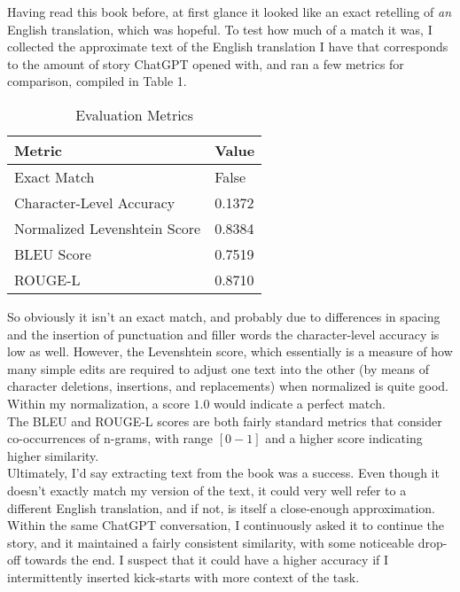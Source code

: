 \documentclass{article}
\begin{document}
Having read this book before, at first glance it looked like an exact retelling of \textit{an} English translation, which was hopeful. To test how much of a match it was, I collected the approximate text of the English translation I have that corresponds to the amount of story ChatGPT opened with, and ran a few metrics for comparison, compiled in Table 1. \\

	\begin{table}[h!]
		\centering
		\begin{tabular}{@{}ll@{}}
			\toprule
			\textbf{Metric}                   & \textbf{Value}            \\ \midrule
			Exact Match                       & False                     \\
			Character-Level Accuracy          & 0.1372                    \\
			Normalized Levenshtein Score      & 0.8384                    \\
			BLEU Score                        & 0.7519                    \\
			ROUGE-L                           & 0.8710                    \\ \bottomrule
		\end{tabular}
		\caption{Evaluation Metrics}
		\label{tab:metrics}
	\end{table}


So obviously it isn't an exact match, and probably due to differences in spacing and the insertion of punctuation and filler words the character-level accuracy is low as well. However, the Levenshtein score, which essentially is a measure of how many simple edits are required to adjust one text into the other (by means of character deletions, insertions, and replacements) when normalized is quite good. Within my normalization, a score $1.0$ would indicate a perfect match. \\

The BLEU and ROUGE-L scores are both fairly standard metrics that consider co-occurrences of n-grams, with range $[0-1]$ and a higher score indicating higher similarity.
\\

Ultimately, I'd say extracting text from the book was a success. Even though it doesn't exactly match my version of the text, it could very well refer to a different English translation, and if not, is itself a close-enough approximation. Within the same ChatGPT conversation, I continuously asked it to continue the story, and it maintained a fairly consistent similarity, with some noticeable drop-off towards the end. I suspect that it could have a higher accuracy if I intermittently inserted kick-starts with more context of the task.
\end{document}
